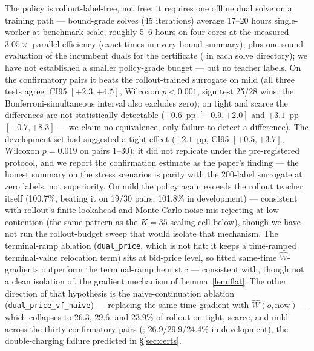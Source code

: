 \documentclass[11pt]{article}
\begin{document}
The policy is rollout-label-free, not free: it requires one offline
dual solve on a training path --- bound-grade solves (45 iterations)
average 17--20 hours single-worker at
benchmark scale, roughly 5--6 hours on four cores at the measured
$3.05\times$ parallel efficiency (exact times in every bound
summary), plus one sound evaluation of the incumbent duals for the
certificate ( in each solve
directory); we have not established a smaller
policy-grade budget --- but no teacher labels. On the confirmatory
pairs it beats the rollout-trained surrogate on mild (all three
tests agree: CI95 $[+2.3, +4.5]$, Wilcoxon $p < 0.001$, sign test
25/28 wins; the Bonferroni-simultaneous interval also excludes
zero); on tight and scarce the differences are not statistically
detectable ($+0.6$~pp $[-0.9, +2.0]$ and $+3.1$~pp $[-0.7, +8.3]$
--- we claim no equivalence, only failure to detect a difference).
The development set had suggested a tight effect ($+2.1$~pp,
CI95 $[+0.5, +3.7]$, Wilcoxon $p = 0.019$ on pairs 1--30); it did
not replicate under the pre-registered protocol, and we report the
confirmation estimate as the paper's finding --- the honest summary
on the stress scenarios is parity with the 200-label surrogate at
zero labels, not superiority. On mild
the policy again exceeds the rollout teacher itself (100.7\%,
beating it on 19/30 pairs; 101.8\% in development) ---
consistent with rollout's finite lookahead and Monte Carlo noise
mis-rejecting at low contention (the same pattern as the $K{=}35$
scaling cell below), though we have not run the rollout-budget sweep
that would isolate that mechanism. The terminal-ramp ablation
(\texttt{dual\_price}, which is not flat: it keeps a time-ramped
terminal-value relocation term) sits at bid-price level, so fitted
same-time $\widehat{W}$-gradients outperform the terminal-ramp
heuristic --- consistent with, though not a clean isolation of, the
gradient mechanism of Lemma~\ref{lem:flat}. The other direction of that hypothesis
is the naive-continuation ablation
(\texttt{dual\_price\_vf\_naive}) --- replacing the same-time
gradient with $\widehat{W}(o, \mathrm{now})$ --- which collapses to
$26.3$, $29.6$, and $23.9\%$ of rollout on tight, scarce, and mild
across the thirty confirmatory pairs
(; 26.9/29.9/24.4\% in
development), the double-charging failure
predicted in \S\ref{sec:certs}.
\end{document}
